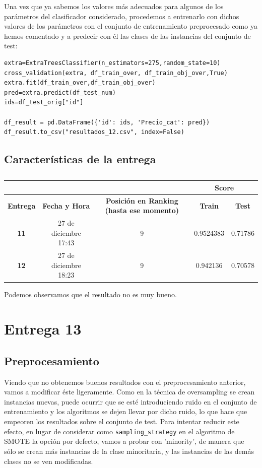 \documentclass[a4paper,11pt]{article}
\begin{document}
Una vez que ya sabemos los valores más adecuados para algunos de los parámetros del clasificador considerado, procedemos a entrenarlo con dichos valores de los parámetros con el conjunto de entrenamiento preprocesado como ya hemos comentado y a predecir con él las clases de las instancias del conjunto de test:

\begin{verbatim}
extra=ExtraTreesClassifier(n_estimators=275,random_state=10)
cross_validation(extra, df_train_over, df_train_obj_over,True)
extra.fit(df_train_over,df_train_obj_over)
pred=extra.predict(df_test_num)
ids=df_test_orig["id"]

df_result = pd.DataFrame({'id': ids, 'Precio_cat': pred})
df_result.to_csv("resultados_12.csv", index=False)
\end{verbatim}

\subsection{Características de la entrega}
\begin{table}[htbp]
	\caption{}
	\begin{tabular}{|c|c|c|c|c|}
		\hline
		\multicolumn{1}{|l|}{\textbf{}} & \textbf{} & \textbf{} & \multicolumn{ 2}{c|}{\textbf{Score}} \\ \hline
		\textbf{Entrega} & \textbf{Fecha y Hora} & \textbf{Posición en Ranking (hasta ese momento)} & \textbf{Train} & \textbf{Test} \\ \hline
		\textbf{11} & 27 de diciembre  17:43 & 9 & 0.9524383 & 0.71786 \\ \hline
		\textbf{12} & 27 de diciembre 18:23 & 9 & 0.942136 & 0.70578 \\ \hline
	\end{tabular}
	\label{}
\end{table}

Podemos observamos que el resultado no es muy bueno.

\section{Entrega 13}
\subsection{Preprocesamiento}

Viendo que no obtenemos buenos resultados con el preprocesamiento anterior, vamos a modificar éste ligeramente. Como en la técnica de oversampling se crean instancias nuevas, puede ocurrir que se esté introduciendo ruido en el conjunto de entrenamiento y los algoritmos se dejen llevar por dicho ruido, lo que hace que empeoren los resultados sobre el conjunto de test. Para intentar reducir este efecto, en lugar de considerar como \texttt{sampling_strategy} en el algoritmo de SMOTE la opción por defecto, vamos a probar con 'minority', de manera que sólo se crean más instancias de la clase minoritaria, y las instancias de las demás clases no se ven modificadas. 
\end{document}

